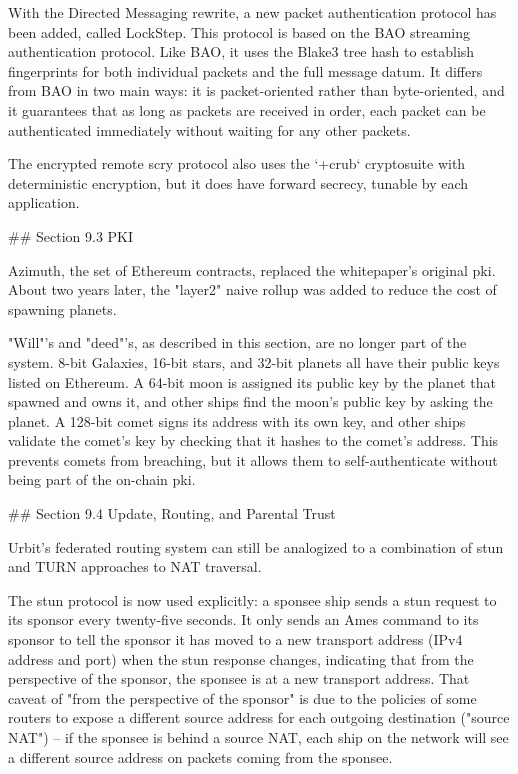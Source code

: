 \documentclass[twoside]{article}
\begin{document}
With the Directed Messaging rewrite, a new packet authentication protocol has been added, called LockStep.  This protocol is based on the BAO streaming authentication protocol.  Like BAO, it uses the Blake3 tree hash to establish fingerprints for both individual packets and the full message datum.  It differs from BAO in two main ways: it is packet-oriented rather than byte-oriented, and it guarantees that as long as packets are received in order, each packet can be authenticated immediately without waiting for any other packets.

The encrypted remote scry protocol also uses the `+crub` cryptosuite with deterministic encryption, but it does have forward secrecy, tunable by each application.

## Section 9.3 PKI

Azimuth, the set of Ethereum contracts, replaced the whitepaper's original {\sc pki}.  About two years later, the "layer2" naive rollup was added to reduce the cost of spawning planets.

"Will"'s and "deed"'s, as described in this section, are no longer part of the system.  8-bit Galaxies, 16-bit stars, and 32-bit planets all have their public keys listed on Ethereum.  A 64-bit moon is assigned its public key by the planet that spawned and owns it, and other ships find the moon's public key by asking the planet.  A 128-bit comet signs its address with its own key, and other ships validate the comet's key by checking that it hashes to the comet's address.  This prevents comets from breaching, but it allows them to self-authenticate without being part of the on-chain {\sc pki}.

## Section 9.4 Update, Routing, and Parental Trust

Urbit's federated routing system can still be analogized to a combination of {\sc stun} and TURN approaches to NAT traversal.

The {\sc stun} protocol is now used explicitly: a sponsee ship sends a {\sc stun} request to its sponsor every twenty-five seconds.  It only sends an Ames command to its sponsor to tell the sponsor it has moved to a new transport address (IPv4 address and port) when the {\sc stun} response changes, indicating that from the perspective of the sponsor, the sponsee is at a new transport address.  That caveat of "from the perspective of the sponsor" is due to the policies of some routers to expose a different source address for each outgoing destination ("source NAT") – if the sponsee is behind a source NAT, each ship on the network will see a different source address on packets coming from the sponsee.
\end{document}
